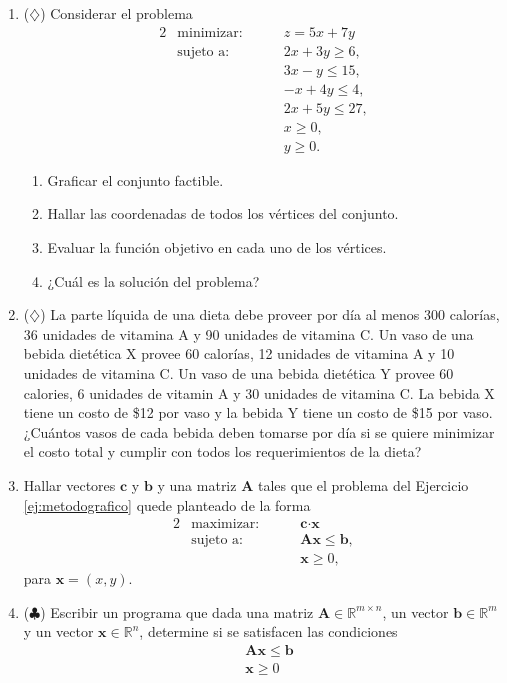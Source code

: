 \documentclass[11pt]{article}
\def \R{\mathbb{R}}
\newcommand{\inner}[2]{#1 \boldsymbol{\cdot} #2}
\newcommand{\bb}{\bm{b}}
\newcommand{\xb}{\bm{x}}
\newcommand{\cb}{\bm{c}}
\newcommand{\Ab}{\bm{A}}
\begin{document}
\begin{enumerate}
\item  ($\diamondsuit$) Considerar el problema
\begin{alignat*}{2}
  & \text{minimizar: } & & z = 5x + 7y \\
   & \text{sujeto a: } & \quad & 2x + 3y \ge 6, \\
   & & & 3x-y \le 15, \\
   & & & -x + 4y \le 4, \\
   & & & 2x + 5y \le 27, \\
   & & & x \ge 0, \\
   & & & y \ge 0.
\end{alignat*}
\begin{enumerate}
\item Graficar el conjunto factible.
\item Hallar las coordenadas de todos los vértices del conjunto.
\item Evaluar la función objetivo en cada uno de los vértices.
\item ¿Cuál es la solución del problema?
\end{enumerate}

\item  ($\diamondsuit$) La parte líquida de una dieta debe proveer por día al menos 300 calorías, 36 unidades de vitamina A y 90 unidades de vitamina C.
Un vaso de una bebida dietética X provee 60 calorías, 12 unidades de vitamina A y 10 unidades de vitamina C.
Un vaso de una bebida dietética Y provee 60 calories, 6 unidades de vitamin A y 30 unidades de vitamina C.
La bebida X tiene un costo de \$12 por vaso y la bebida Y tiene un costo de \$15 por vaso. ¿Cuántos vasos de cada bebida deben tomarse por día si se quiere minimizar el costo total y cumplir con todos los requerimientos de la dieta?


\item \label{ej:primal} Hallar vectores $\cb$ y $\bb$ y una matriz $\Ab$ tales que el problema del Ejercicio \ref{ej:metodografico} quede planteado de la forma
\begin{alignat*}{2}
  & \text{maximizar: } & \quad & \inner{\cb}{\xb} \\
   & \text{sujeto a: } & & \Ab \xb \le \bb, \\
   & & & \xb \ge 0,
\end{alignat*}
para $\xb = (x, y)$.


\item ($\clubsuit$) Escribir un programa que dada una matriz $\Ab \in \R^{m \times n}$, un vector $\bb \in \R^m$ y un vector $\xb \in \R^n$, determine si se satisfacen las condiciones
\begin{align*}
& \Ab \xb \le \bb \\
& \xb \ge 0
\end{align*}


\end{enumerate}
\end{document}
